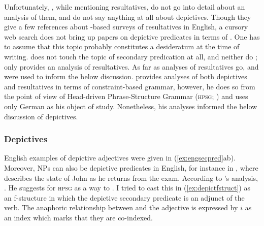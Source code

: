 Unfortunately, \citet[347]{bresnan2016}, while mentioning resultatives, do not
go into detail about an \Lfg{} analysis of them, and do not say anything at all
about depictives. Though they give a few references about \Lfg{}-based surveys
of resultatives in English, a cursory web search does not bring up papers on
depictive predicates in terms of \Lfg{}. One has to assume that this topic
probably constitutes a desideratum at the time of writing.
\citet{dalrymple2001} does not touch the topic of secondary predication at all,
and neither do \citet{butt1999}; \citet{falk2001} only provides an analysis of
resultatives. As far as \Lfg{} analyses of resultatives go, \citet{simpson1983}
and \citet{christie2013} were used to inform the below discussion.
\textcites{mueller2002} provides analyses of both depictives and resultatives
in terms of constraint-based grammar, however, he does so from the point of
view of Head-driven Phrase-Structure Grammar (\textsc{hpsg};
\cite{pollardsag1994}) and uses only German as his object of study.
Nonetheless, his analyses informed the below discussion of depictives.

\subsubsection{Depictives}
\label{subsubsec:depict}

English examples of depictive adjectives were given in (\ref{ex:engsecpred}ab).
Moreover, NPs can also be depictive predicates in English, for instance in 
, where 
describes the state of John as he returns from the exam. According to
\citet{mueller2002}'s analysis, . He suggests for \textsc{hpsg}  as a way to
. I tried to cast this in (\ref{ex:depictfstruct}) as an
f-structure in which the depictive secondary predicate is an adjunct of the
verb. The anaphoric relationship between \Subj{} and the adjective is expressed
by $i$ as an index which marks that they are co-indexed.

